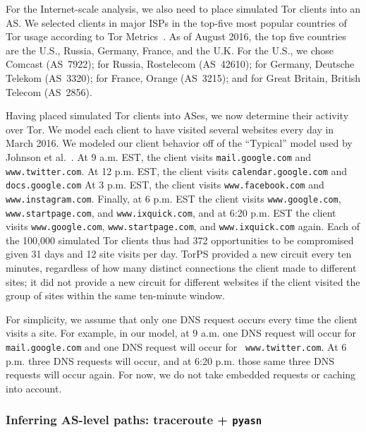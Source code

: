 For the Internet-scale analysis, we also need to place simulated Tor clients
into an AS.  We selected clients in major ISPs in the top-five most popular
countries of Tor usage according to Tor Metrics~\cite{metrics-countries}.
As of August
2016, the top five countries are the U.S., Russia, Germany, France, and the U.K.
For the U.S., we chose Comcast (AS~7922); for Russia, Rostelecom (AS~42610); for
Germany, Deutsche Telekom (AS~3320); for France, Orange (AS~3215); and for Great
Britain, British Telecom (AS~2856).

Having placed simulated Tor clients into ASes, we now determine their activity
over Tor.  We model each client to have visited several websites every day in March 2016.  We
modeled our client behavior off of the ``Typical'' model used
by Johnson et al.~\cite[\S~5.1.2]{Johnson2013a}.  At 9 a.m. EST, the client visits
{\tt mail.google.com} and {\tt www.twitter.com}.  At 12 p.m. EST, the client visits
{\tt calendar.google.com} and {\tt docs.google.com} 
At 3 p.m. EST, the client visits {\tt www.facebook.com} and {\tt www.instagram.com}. 
Finally, at 6 p.m. EST the client 
visits {\tt www.google.com}, {\tt www.startpage.com}, and {\tt www.ixquick.com}, 
and at 6:20 p.m. EST the client visits {\tt www.google.com}, {\tt www.startpage.com}, 
and {\tt www.ixquick.com} again. Each of the 100,000 simulated Tor clients thus
had 372 opportunities to be compromised given 31 days and 12 site visits per
day.  TorPS provided a new circuit every ten minutes, regardless of how many
distinct connections the client made to different sites; it did not provide a
new circuit for different websites if the client visited the group of sites
within the same ten-minute window.

For simplicity, we assume that only one DNS request occurs every time the client
visits a site. For example, in our model, at 9 a.m. one DNS request will occur
for {\tt mail.google.com} and one DNS request will occur for {\tt
www.twitter.com}. At 6 p.m. three DNS requests will occur, and at 6:20 p.m.
those same three DNS requests will occur again.   For now, we do
not take embedded requests or caching into account.

\subsubsection{Inferring AS-level paths: traceroute + {\tt pyasn}}


